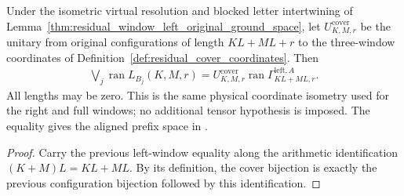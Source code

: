 \begin{lemma}
    \label{thm:residual_window_left_joint_range_cover}
    \leanok
    Under the isometric virtual resolution and blocked letter intertwining of
    Lemma~\ref{thm:residual_window_left_original_ground_space}, let
    $U^{\mathrm{cover}}_{K,M,r}$ be the unitary from original configurations
    of length $KL+ML+r$ to the three-window coordinates of
    Definition~\ref{def:residual_cover_coordinates}. Then
    \begin{align}
        \bigvee_j\operatorname{ran}L_{B_j}(K,M,r)
        =U^{\mathrm{cover}}_{K,M,r}\operatorname{ran}
        \Gamma^{\mathrm{left},A}_{KL+ML,r}.
    \end{align}
    All lengths may be zero. This is the same physical coordinate isometry
    used for the right and full windows; no additional tensor hypothesis
    is imposed. The equality gives the aligned prefix space in
    \cite[Lemma~commutation(ii)]{Nachtergaele1996Spectral}.
\end{lemma}
\begin{proof}\leanok
    Carry the previous left-window equality along the arithmetic
    identification $(K+M)L=KL+ML$. By its definition, the cover bijection is
    exactly the previous configuration bijection followed by this identification.
\end{proof}

